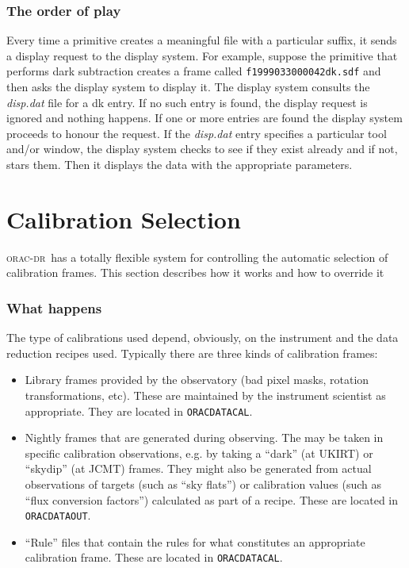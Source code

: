 \documentclass[twoside,11pt]{article}
\renewcommand{\_}{\texttt{\symbol{95}}}
\newcommand{\oracdr}{\textsc{orac-dr}}
\begin{document}
\subsubsection*{The order of play\label{The_ORAC-DR_Display_System_The_order_of_play}}

Every time a primitive creates a meaningful file with a particular
suffix, it sends a display request to the display system. For example, 
suppose the primitive that performs dark subtraction creates a frame
called \texttt{f19990330\_00042\_dk.sdf} and then asks the display system to
display it. The display system consults the \emph{disp.dat} file for a dk
entry. If no such entry is found, the display request is ignored and
nothing happens. If one or more entries are found the display system
proceeds to honour the request. If the \emph{disp.dat} entry specifies a
particular tool and/or window, the display system checks to see if
they exist already and if not, stars them. Then it displays the data
with the appropriate parameters.


\section{Calibration Selection\label{Calibration_Selection}}

\oracdr\ has a totally flexible system for controlling the automatic
selection of calibration frames. This section describes how it works and
how to override it

\subsubsection*{What happens\label{The_ORAC-DR_Calibration_Selection_What_happens}}

The type of calibrations used depend, obviously, on the instrument and
the data reduction recipes used. Typically there are three kinds of
calibration frames:

\begin{itemize}
\item 

Library frames provided by the observatory (bad pixel masks, rotation
transformations, etc). These are maintained by the instrument
scientist as appropriate. They are located in \texttt{ORAC\_DATA\_CAL}.

\item 

Nightly frames that are generated during observing. The may be taken
in specific calibration observations, e.g. by taking a ``dark'' (at UKIRT)
or ``skydip'' (at JCMT) frames. They might also be generated from
actual observations of targets (such as ``sky flats'') or
calibration values (such as ``flux conversion factors'') calculated
as part of a recipe. These are located in \texttt{ORAC\_DATA\_OUT}.

\item 

``Rule'' files that contain the rules for what constitutes an
appropriate calibration frame. These are located in \texttt{ORAC\_DATA\_CAL}.

\end{itemize}
\end{document}
